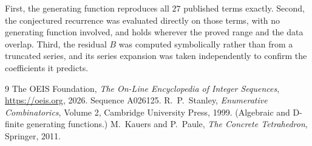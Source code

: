 \documentclass[11pt,a4paper]{article}
\theoremstyle{plain}
\theoremstyle{definition}
\begin{document}
First, the generating function reproduces all $27$ published terms exactly. Second,
the conjectured recurrence was evaluated directly on those terms, with no generating function
involved, and holds wherever the proved range and the data overlap. Third, the residual $B$ was
computed symbolically rather than from a truncated series, and its series expansion was taken
independently to confirm the coefficients it predicts.

\begin{thebibliography}{9}
 The OEIS Foundation, \emph{The On-Line Encyclopedia of Integer Sequences},
\url{https://oeis.org}, 2026. Sequence A026125.
 R.~P.~Stanley, \emph{Enumerative Combinatorics}, Volume 2, Cambridge
University Press, 1999. (Algebraic and D-finite generating functions.)
 M.~Kauers and P.~Paule, \emph{The Concrete Tetrahedron}, Springer, 2011.
\end{thebibliography}
\end{document}
